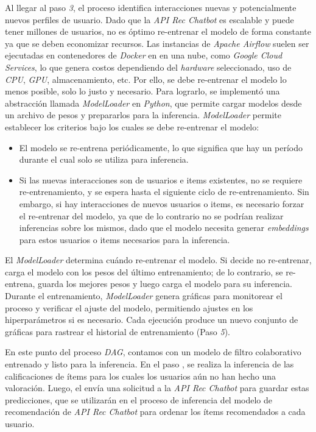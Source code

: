 \documentclass[11pt,a4paper,twoside]{thesis}
\begin{document}
Al llegar al paso \textit{3}, el proceso identifica interacciones nuevas y potencialmente nuevos perfiles de usuario. Dado que la \textit{API Rec Chatbot} es escalable y puede tener millones de usuarios, no es óptimo re-entrenar  el modelo de forma constante ya que se deben economizar recursos. Las instancias de \textit{Apache Airflow} suelen ser ejecutadas en contenedores de \textit{Docker} en en una nube, como \textit{Google Cloud Services}, lo que genera costos dependiendo del \textit{hardware} seleccionado, uso de \textit{CPU}, \textit{GPU}, almacenamiento, etc. Por ello, se debe re-entrenar el modelo lo menos posible, solo lo justo y necesario. Para lograrlo, se implementó una abstracción llamada \textit{ModelLoader} en \textit{Python}, que permite cargar modelos desde un archivo de pesos y prepararlos para la inferencia. \textit{ModelLoader} permite establecer los criterios bajo los cuales se debe re-entrenar el modelo:

\begin{itemize}
	\item El modelo se re-entrena periódicamente, lo que significa que hay un período durante el cual solo se utiliza para inferencia.
	\item Si las nuevas interacciones son de usuarios e items existentes, no se requiere re-entrenamiento, y se espera hasta el siguiente ciclo de re-entrenamiento. Sin embargo, si hay interacciones de nuevos usuarios o items, es necesario forzar el re-entrenar  del modelo, ya que de lo contrario no se podrían realizar inferencias sobre los mismos, dado que el modelo necesita generar \textit{embeddings} para estos usuarios o items necesarios para la inferencia.
\end{itemize}

El \textit{ModelLoader} determina cuándo re-entrenar el modelo. Si decide no re-entrenar, carga el modelo con los pesos del último entrenamiento; de lo contrario, se re-entrena, guarda los mejores pesos y luego carga el modelo para su inferencia. Durante el entrenamiento, \textit{ModelLoader} genera gráficas para monitorear el proceso y verificar el ajuste del modelo, permitiendo ajustes en los hiperparámetros si es necesario. Cada ejecución produce un nuevo conjunto de gráficas para rastrear el historial de entrenamiento (Paso \textit{5}).

En este punto del proceso \textit{DAG}, contamos con un modelo de filtro colaborativo entrenado y listo para la inferencia. En el paso , se realiza la inferencia de las calificaciones de ítems para los cuales los usuarios aún no han hecho una valoración. Luego, el  envía una solicitud  a la \textit{API Rec Chatbot} para guardar estas predicciones, que se utilizarán en el proceso de inferencia del modelo de recomendación de \textit{API Rec Chatbot} para ordenar los ítems recomendados a cada usuario.
\end{document}
